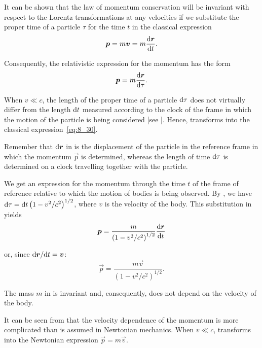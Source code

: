 It can be shown that the law of momentum conservation will be invariant with respect to the Lorentz transformations at any velocities if we substitute the proper time of a particle $\tau$ for the time $t$ in the classical expression
\begin{equation}\label{eq:8_30}
	\boldsymbol{p} = m\boldsymbol{v} = m\frac{\mathrm{d}\boldsymbol{r}}{\mathrm{d} t}.
\end{equation}

\noindent
Consequently, the relativistic expression for the momentum has the form
\begin{equation}\label{eq:8_31}
	\boldsymbol{p} = m\frac{\mathrm{d}\boldsymbol{r}}{\mathrm{d}\tau}.
\end{equation}

\noindent
When $v\ll c$, the length of the proper time of a particle $\mathrm{d}\tau$ does not virtually differ from the length $\mathrm{d} t$ measured according to the clock of the frame in which the motion of the particle is being considered [see ]. Hence,  transforms into the classical expression~\eqref{eq:8_30}.

Remember that $\mathrm{d}\boldsymbol{r}$ in  is the displacement of the particle in the reference frame in which the momentum $\vec{p}$ is determined, whereas the length of time $\mathrm{d}\tau$ is determined on a clock travelling together with the particle.

We get an expression for the momentum through the time $t$ of the frame of reference relative to which the motion of bodies is being observed. By , we have $\mathrm{d}\tau=\mathrm{d} t\left(1-v^2/c^2\right)^{1/2}$, where $v$ is the velocity of the body. This substitution in  yields
\begin{equation*}
	\boldsymbol{p} = \frac{m}{\left(1-v^2/c^2\right)^{1/2}}\frac{\mathrm{d}\boldsymbol{r}}{\mathrm{d} t}
\end{equation*}

\noindent
or, since $\mathrm{d}\boldsymbol{r}/\mathrm{d} t=\boldsymbol{v}$:
\begin{equation}\label{eq:8_32}
	\vec{p} = \frac{m\vec{v}}{\left(1-v^2/c^2\right)^{1/2}}.
\end{equation}

The mass $m$ in  is invariant and, consequently, does not depend on the velocity of the body.

It can be seen from  that the velocity dependence of the momentum is more complicated than is assumed in Newtonian mechanics. When $v\ll c$,  transforms into the Newtonian expression $\vec{p}=m\vec{v}$.

